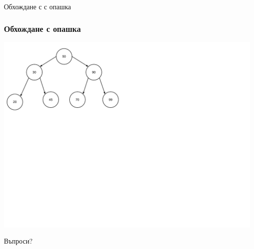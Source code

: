 \documentclass{beamer}
\begin{document}
\begin{frame}
\centerline{Обхождане с с опашка}
\end{frame}



\begin{frame}[fragile]
\frametitle{Обхождане с опашка}

\includegraphics[width=14cm]{images/tree_bot_clean}

\end{frame}






\begin{frame}
\centerline{Въпроси?}
\end{frame}
\end{document}
